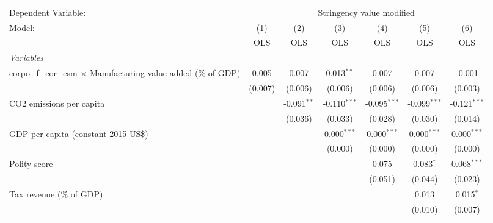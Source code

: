 
\begingroup
\centering
\begin{tabular}{lcccccc}
   \toprule
   Dependent Variable: & \multicolumn{6}{c}{Stringency value modified}\\
   Model:                                                                 & (1)     & (2)           & (3)            & (4)            & (5)            & (6)\\  
                                                                          &  OLS    & OLS           & OLS            & OLS            & OLS            & OLS\\  
   \midrule
   \emph{Variables}\\
   corpo\_f\_cor\_esm $\times$ Manufacturing value added (\% of GDP)      & 0.005   & 0.007         & 0.013$^{**}$   & 0.007          & 0.007          & -0.001\\   
                                                                          & (0.007) & (0.006)       & (0.006)        & (0.006)        & (0.006)        & (0.003)\\   
   CO2 emissions per capita                                               &         & -0.091$^{**}$ & -0.110$^{***}$ & -0.095$^{***}$ & -0.099$^{***}$ & -0.121$^{***}$\\   
                                                                          &         & (0.036)       & (0.033)        & (0.028)        & (0.030)        & (0.014)\\   
   GDP per capita (constant 2015 US\$)                                    &         &               & 0.000$^{***}$  & 0.000$^{***}$  & 0.000$^{***}$  & 0.000$^{***}$\\   
                                                                          &         &               & (0.000)        & (0.000)        & (0.000)        & (0.000)\\   
   Polity score                                                           &         &               &                & 0.075          & 0.083$^{*}$    & 0.068$^{***}$\\   
                                                                          &         &               &                & (0.051)        & (0.044)        & (0.023)\\   
   Tax revenue (\% of GDP)                                                &         &               &                &                & 0.013          & 0.015$^{*}$\\   
                                                                          &         &               &                &                & (0.010)        & (0.007)\\   

\end{tabular}
